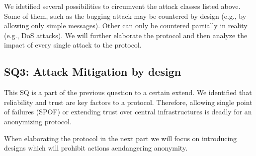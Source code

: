 We idetified several possibilities to circumvent the attack classes listed above. Some of them, such as the bugging attack may be countered by design (e.g., by allowing only  simple messages). Other can only be countered partially in reality (e.g., DoS attacks). We will further elaborate the protocol and then analyze the impact of every single attack to the protocol.

\subsection{SQ3: Attack Mitigation by design}
This SQ is a part of the previous question to a certain extend. We identified that reliability and trust are key factors to a protocol. Therefore, allowing single point of failures (SPOF) or extending trust over central infrastructures is deadly for an anonymizing protocol. 

When elaborating the protocol in the next part we will focus on introducing designs which will prohibit actions aendangering anonymity.

